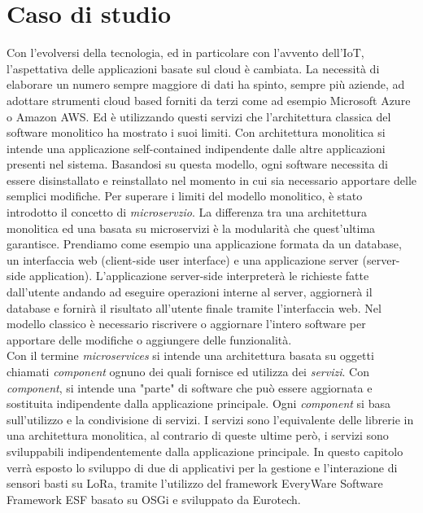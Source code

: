 \chapter{Caso di studio}
Con l'evolversi della tecnologia, ed in particolare con l'avvento dell'IoT,
l'aspettativa delle applicazioni basate sul cloud è cambiata. La necessità di
elaborare un numero sempre maggiore di dati ha spinto, sempre più aziende, ad
adottare strumenti cloud based forniti da terzi come ad esempio Microsoft Azure o Amazon
AWS.  Ed è utilizzando questi servizi  che l'architettura classica del
software monolitico ha mostrato i suoi limiti. Con architettura monolitica si
intende una applicazione self-contained indipendente dalle altre
applicazioni presenti nel sistema.  Basandosi su questa modello, ogni
software necessita di essere disinstallato e reinstallato nel momento in cui
sia necessario apportare delle semplici modifiche. Per superare i limiti del
modello monolitico, è stato introdotto il concetto di 
\emph{microservzio}.  La differenza tra una architettura monolitica ed una
basata su microservizi è la  modularità che quest'ultima garantisce.  Prendiamo
come esempio una applicazione formata da un database, un interfaccia web
(client-side user interface)  e una applicazione server (server-side
application).  L'applicazione server-side interpreterà le richieste fatte
dall'utente andando ad eseguire operazioni interne al server, aggiornerà il
database e fornirà il risultato all'utente finale tramite l'interfaccia web.
Nel modello classico  è necessario riscrivere o aggiornare l'intero 
software per apportare delle modifiche o aggiungere delle funzionalità.\\ 
Con il termine \emph{microservices}
si intende una architettura basata su oggetti chiamati \emph{component} ognuno
dei quali fornisce ed utilizza dei \emph{servizi}. Con \textit{component}, si intende
una "parte" di software che può essere aggiornata e sostituita indipendente
dalla applicazione principale.  Ogni \emph{component} si basa sull'utilizzo e la
condivisione di servizi.  I servizi sono l'equivalente delle librerie in una
architettura monolitica, al contrario di queste ultime però, i servizi sono
sviluppabili indipendentemente dalla applicazione principale.
In questo capitolo verrà esposto lo sviluppo di due 
 di applicativi per la gestione e l'interazione di sensori
basti su LoRa, tramite l'utilizzo del framework EveryWare Software Framework ESF
basato su OSGi e sviluppato da Eurotech.
